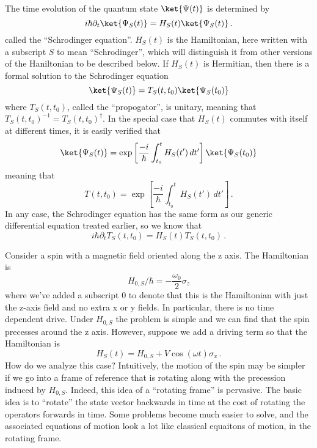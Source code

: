 

The time evolution of the quantum state $\ket{\Psi(t)}$ is determined by
\begin{equation}
  i \hbar \partial_t \ket{\Psi_S(t)} = H_S(t) \ket{\Psi_S(t)}
  \, .
\end{equation}
called the ``Schrodinger equation''.
$H_S(t)$ is the Hamiltonian, here written with a subscript $S$ to mean ``Schrodinger'', which will distinguish it from other versions of the Haniltonian to be described below.
If $H_S(t)$ is Hermitian, then there is a formal solution to the Schrodinger equation
\begin{equation}
  \ket{\Psi_S(t)} = T_S(t,t_0) \ket{\Psi_S(t_0)}
\end{equation}
where $T_S(t, t_0)$, called the ``propogator'', is unitary, meaning that $T_S(t, t_0)^{-1} = T_S(t, t_0)^\dagger$.
In the special case that $H_S(t)$ commutes with itself at different times, it is easily verified that
\begin{equation}
  \ket{\Psi_S(t)}
  = \exp \left[ \frac{-i}{\hbar}\int_{t_0}^{t}H_S(t') \, dt' \right] \ket{\Psi_S(t_0)}
\end{equation}
meaning that
\begin{equation}
  T(t,t_0) = \exp \left[\frac{-i}{\hbar}\int_{t_0}^t H_{S}(t') \, dt' \right]
  \, .
\end{equation}
In any case, the Schrodinger equation has the same form as our generic differential equation treated earlier, so we know that
\begin{equation}
  i \hbar \partial_t T_S(t, t_0) = H_S(t) T_S(t, t_0) \, .
\end{equation}


Consider a spin with a magnetic field oriented along the z axis.
The Hamiltonian is
\begin{equation}
  H_{0, S}/\hbar = -\frac{\omega_0}{2}\sigma_z
\end{equation}
where we've added a subscript $0$ to denote that this is the Hamiltonian with just the z-axis field and no extra x or y fields.
In particular, there is no time dependent drive.
Under $H_{0, S}$ the problem is simple and we can find that the spin precesses around the z axis.
However, suppose we add a driving term so that the Hamiltonian is
\begin{equation}
  H_S(t) = H_{0, S} + V \cos(\omega t) \sigma_x \, .
\end{equation}
How do we analyze this case?
Intuitively, the motion of the spin may be simpler if we go into a frame of reference that is rotating along with the precession induced by $H_{0, S}$.
Indeed, this idea of a ``rotating frame'' is pervasive.
The basic idea is to ``rotate'' the state vector backwards in time at the cost of rotating the operators forwards in time.
Some problems become much easier to solve, and the associated equations of motion look a lot like classical equaitons of motion, in the rotating frame.

